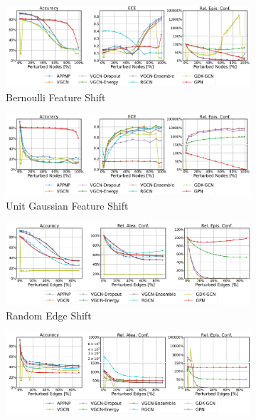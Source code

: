 \begin{figure}
    \centering
    \begin{subfigure}{\textwidth}
        \includegraphics[width=\textwidth]{sections/009_neurips2021/resources/plots/AmazonPhotos-bernoulli-shift.pdf}
        \caption{Bernoulli Feature Shift}
    \end{subfigure}
    \begin{subfigure}{\textwidth}
        \includegraphics[width=\textwidth]{sections/009_neurips2021/resources/plots/AmazonPhotos-normal-shift.pdf}
        \caption{Unit Gaussian Feature Shift}
    \end{subfigure}
    \begin{subfigure}{\textwidth}
        \includegraphics[width=\textwidth]{sections/009_neurips2021/resources/plots/AmazonPhotos-random-shift.pdf}
        \caption{Random Edge Shift}
    \end{subfigure}
    \begin{subfigure}{\textwidth}
        \includegraphics[width=\textwidth]{sections/009_neurips2021/resources/plots/AmazonPhotos-dice-shift.pdf}

\end{subfigure}
\end{figure}
